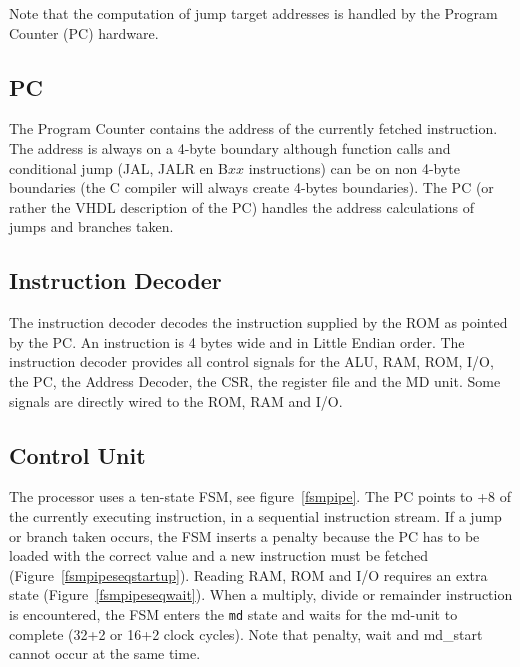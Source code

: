 \documentclass[12pt]{article}
\begin{document}
Note that the computation of jump target addresses is handled by the Program Counter (PC) hardware.

\subsection{PC}
\label{sec:pc}
The Program Counter contains the address of the currently fetched instruction. The address is always on a 4-byte boundary although function calls and conditional jump (JAL, JALR en B$xx$ instructions) can be on non 4-byte boundaries (the C compiler will always create 4-bytes boundaries). The PC (or rather the VHDL description of the PC) handles the address calculations of jumps and branches taken.

\subsection{Instruction Decoder}
\label{sec:instructiondecoder}
The instruction decoder decodes the instruction supplied by the ROM as pointed by the PC. An instruction is 4 bytes wide and in Little Endian order. The instruction decoder provides all control signals for the ALU, RAM, ROM, I/O, the PC, the Address Decoder, the CSR, the register file and the MD unit. Some signals are directly wired to the ROM, RAM and I/O.

\subsection{Control Unit}
The processor uses a ten-state FSM, see figure~\ref{fsmpipe}. The PC points to +8 of the currently executing instruction, in a sequential instruction stream. If a jump or branch taken occurs, the FSM inserts a penalty because the PC has to be loaded with the correct value and a new instruction must be fetched (Figure~\ref{fsmpipeseqstartup}). Reading RAM, ROM and I/O requires an extra state (Figure~\ref{fsmpipeseqwait}). When a multiply, divide or remainder instruction is encountered, the FSM enters the \texttt{md} state and waits for the md-unit to complete (32+2 or 16+2 clock cycles). Note that penalty, wait and md\_start cannot occur at the same time.
\end{document}
